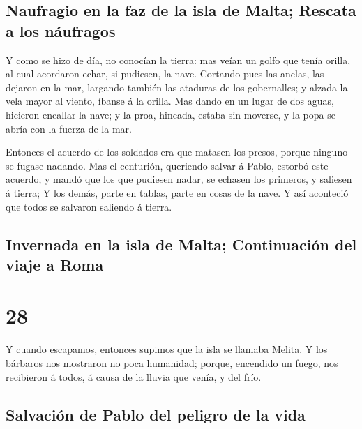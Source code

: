 \hypertarget{naufragio-en-la-faz-de-la-isla-de-malta-rescata-a-los-nuxe1ufragos}{%
\subsection{Naufragio en la faz de la isla de Malta; Rescata a los
náufragos}\label{naufragio-en-la-faz-de-la-isla-de-malta-rescata-a-los-nuxe1ufragos}}

 Y como se hizo de día, no conocían la tierra: mas veían
un golfo que tenía orilla, al cual acordaron echar, si pudiesen, la
nave.  Cortando pues las anclas, las dejaron en la mar,
largando también las ataduras de los gobernalles; y alzada la vela mayor
al viento, íbanse á la orilla.  Mas dando en un lugar de
dos aguas, hicieron encallar la nave; y la proa, hincada, estaba sin
moverse, y la popa se abría con la fuerza de la mar.

 Entonces el acuerdo de los soldados era que matasen los
presos, porque ninguno se fugase nadando.  Mas el
centurión, queriendo salvar á Pablo, estorbó este acuerdo, y mandó que
los que pudiesen nadar, se echasen los primeros, y saliesen á tierra;
 Y los demás, parte en tablas, parte en cosas de la nave.
Y así aconteció que todos se salvaron saliendo á tierra.

\hypertarget{invernada-en-la-isla-de-malta-continuaciuxf3n-del-viaje-a-roma}{%
\subsection{Invernada en la isla de Malta; Continuación del viaje a
Roma}\label{invernada-en-la-isla-de-malta-continuaciuxf3n-del-viaje-a-roma}}

\hypertarget{section-44-28}{%
\section{28}\label{section-44-28}}

 Y cuando escapamos, entonces supimos que la isla se
llamaba Melita.  Y los bárbaros nos mostraron no poca
humanidad; porque, encendido un fuego, nos recibieron á todos, á causa
de la lluvia que venía, y del frío.

\hypertarget{salvaciuxf3n-de-pablo-del-peligro-de-la-vida}{%
\subsection{Salvación de Pablo del peligro de la
vida}\label{salvaciuxf3n-de-pablo-del-peligro-de-la-vida}}

